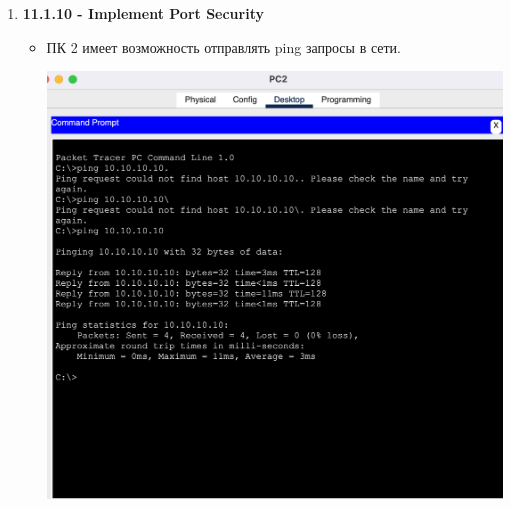 \documentclass[a4paper,14pt]{extarticle}
\begin{document}
    \begin{enumerate}
        \item \textbf{11.1.10 - Implement Port Security}
            \begin{itemize}
                \vspace{-2ex}
                \item ПК 2 имеет возможность отправлять ping запросы в сети.
                    \begin{center}
                        \includegraphics[scale=0.5]{pics/11.1.10_1.png}
                    \end{center}


\end{itemize}
\end{enumerate}
\end{document}
